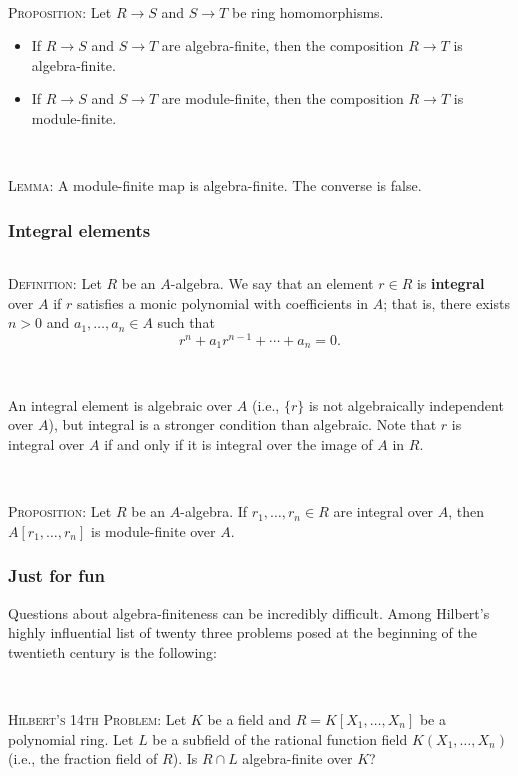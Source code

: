 \documentclass[12pt]{amsart}
\newcommand{\0}{$\phantom{.}$}
\newcommand{\1}{\mathbbm{1}}
\newcommand{\sssec}[1]{\subsubsection*{#1}}
\begin{document}
\

\noindent \textsc{Proposition:} Let $R\to S$ and $S\to T$ be ring homomorphisms.
\begin{itemize}
\item If $R\to S$ and $S\to T$ are algebra-finite, then the composition $R\to T$ is algebra-finite.
\item If $R\to S$ and $S\to T$ are module-finite, then the composition $R\to T$ is module-finite.
\end{itemize}

\

\noindent \textsc{Lemma:} A module-finite map is algebra-finite. The converse is false.



\vspace{3mm}


\sssec{Integral elements} \0

\vspace{3mm}

\noindent \textsc{Definition:} Let $R$ be an $A$-algebra. We say that an element $r\in R$ is \textbf{integral} over $A$ if $r$ satisfies a monic polynomial with coefficients in $A$; that is, there exists $n>0$ and $a_1,\dots,a_n\in A$ such that
\[ r^n + a_1 r^{n-1} + \cdots + a_n = 0.\]

\

\noindent An integral element is algebraic over $A$ (i.e., $\{r\}$ is not algebraically independent over $A$), but integral is a stronger condition than algebraic. Note that $r$ is integral over $A$ if and only if it is integral over the image of $A$ in $R$.


\

\noindent \textsc{Proposition:} Let $R$ be an $A$-algebra. If $r_1,\dots,r_n\in R$ are integral over $A$, then $A[r_1,\dots,r_n]$ is module-finite over $A$.
 
 

\vfill

\noindent \hrulefill

\subsubsection*{Just for fun} Questions about algebra-finiteness can be incredibly difficult. Among Hilbert's highly influential list of twenty three problems posed at the beginning of the twentieth century is the following:

\

\noindent \textsc{Hilbert's 14th Problem:} Let $K$ be a field and $R=K[X_1,\dots,X_n]$ be a polynomial ring. Let $L$ be a subfield of the rational function field $K(X_1,\dots,X_n)$ (i.e., the fraction field of $R$). Is $R\cap L$ algebra-finite over $K$?
\end{document}
